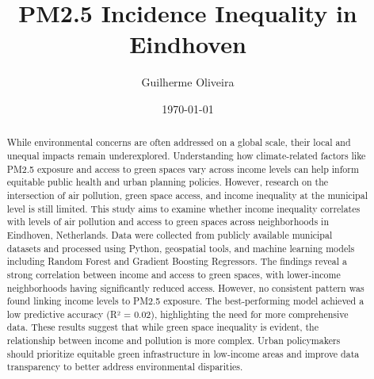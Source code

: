 \documentclass[12pt, a4paper]{article}
\title{PM2.5 Incidence Inequality in Eindhoven}
\author{Guilherme Oliveira}
\date{\today}
\begin{document}
\maketitle
\begin{abstract}
    While environmental concerns are often addressed on a global scale, their local and unequal impacts remain underexplored. Understanding how climate-related factors like PM2.5 exposure and access to green spaces vary across income levels can help inform equitable public health and urban planning policies. However, research on the intersection of air pollution, green space access, and income inequality at the municipal level is still limited. This study aims to examine whether income inequality correlates with levels of air pollution and access to green spaces across neighborhoods in Eindhoven, Netherlands. Data were collected from publicly available municipal datasets and processed using Python, geospatial tools, and machine learning models including Random Forest and Gradient Boosting Regressors. The findings reveal a strong correlation between income and access to green spaces, with lower-income neighborhoods having significantly reduced access. However, no consistent pattern was found linking income levels to PM2.5 exposure. The best-performing model achieved a low predictive accuracy (R² = 0.02), highlighting the need for more comprehensive data. These results suggest that while green space inequality is evident, the relationship between income and pollution is more complex. Urban policymakers should prioritize equitable green infrastructure in low-income areas and improve data transparency to better address environmental disparities.
\end{abstract}
\end{document}
